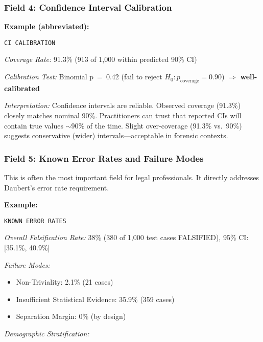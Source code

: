 \subsubsection{Field 4: Confidence Interval Calibration}

\textbf{Example (abbreviated):}

\texttt{CI CALIBRATION}

\textit{Coverage Rate:} 91.3\% (913 of 1,000 within predicted 90\% CI)

\textit{Calibration Test:} Binomial p~=~0.42 (fail to reject $H_0: p_{\text{coverage}} = 0.90$) $\Rightarrow$ \textbf{well-calibrated}

\textit{Interpretation:} Confidence intervals are reliable. Observed coverage (91.3\%) closely matches nominal 90\%. Practitioners can trust that reported CIs will contain true values $\sim$90\% of the time. Slight over-coverage (91.3\% vs.\ 90\%) suggests conservative (wider) intervals—acceptable in forensic contexts.

\subsubsection{Field 5: Known Error Rates and Failure Modes}

This is often the most important field for legal professionals. It directly addresses Daubert's error rate requirement.

\textbf{Example:}

\texttt{KNOWN ERROR RATES}

\textit{Overall Falsification Rate:} 38\% (380 of 1,000 test cases FALSIFIED), 95\% CI: [35.1\%, 40.9\%]

\textit{Failure Modes:}
\begin{itemize}
\item Non-Triviality: 2.1\% (21 cases)
\item Insufficient Statistical Evidence: 35.9\% (359 cases)
\item Separation Margin: 0\% (by design)
\end{itemize}

\textit{Demographic Stratification:}

